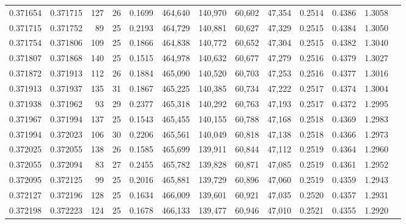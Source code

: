 \begin{tabular}{rrrrrrrrrrrrr}
0.371654 & 0.371715 &   127 &  26 &                                     0.1699 & 464,640 & 140,970 &  60,602 &  47,354 & 0.2514 & 0.4386 & 1.3058 \\
0.371715 & 0.371752 &    89 &  25 &                                     0.2193 & 464,729 & 140,881 &  60,627 &  47,329 & 0.2515 & 0.4384 & 1.3050 \\
0.371754 & 0.371806 &   109 &  25 &                                     0.1866 & 464,838 & 140,772 &  60,652 &  47,304 & 0.2515 & 0.4382 & 1.3040 \\
0.371807 & 0.371868 &   140 &  25 &                                     0.1515 & 464,978 & 140,632 &  60,677 &  47,279 & 0.2516 & 0.4379 & 1.3027 \\
0.371872 & 0.371913 &   112 &  26 &                                     0.1884 & 465,090 & 140,520 &  60,703 &  47,253 & 0.2516 & 0.4377 & 1.3016 \\
0.371913 & 0.371937 &   135 &  31 &                                     0.1867 & 465,225 & 140,385 &  60,734 &  47,222 & 0.2517 & 0.4374 & 1.3004 \\
0.371938 & 0.371962 &    93 &  29 &                                     0.2377 & 465,318 & 140,292 &  60,763 &  47,193 & 0.2517 & 0.4372 & 1.2995 \\
0.371967 & 0.371994 &   137 &  25 &                                     0.1543 & 465,455 & 140,155 &  60,788 &  47,168 & 0.2518 & 0.4369 & 1.2983 \\
0.371994 & 0.372023 &   106 &  30 &                                     0.2206 & 465,561 & 140,049 &  60,818 &  47,138 & 0.2518 & 0.4366 & 1.2973 \\
0.372025 & 0.372055 &   138 &  26 &                                     0.1585 & 465,699 & 139,911 &  60,844 &  47,112 & 0.2519 & 0.4364 & 1.2960 \\
0.372055 & 0.372094 &    83 &  27 &                                     0.2455 & 465,782 & 139,828 &  60,871 &  47,085 & 0.2519 & 0.4361 & 1.2952 \\
0.372095 & 0.372125 &    99 &  25 &                                     0.2016 & 465,881 & 139,729 &  60,896 &  47,060 & 0.2519 & 0.4359 & 1.2943 \\
0.372127 & 0.372196 &   128 &  25 &                                     0.1634 & 466,009 & 139,601 &  60,921 &  47,035 & 0.2520 & 0.4357 & 1.2931 \\
0.372198 & 0.372223 &   124 &  25 &                                     0.1678 & 466,133 & 139,477 &  60,946 &  47,010 & 0.2521 & 0.4355 & 1.2920 \\

\end{tabular}
